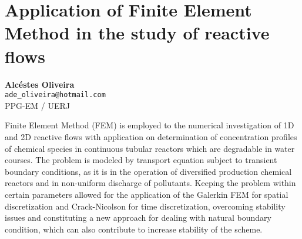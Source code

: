 
\section{Application of Finite Element Method in the study of reactive flows}

\textbf{Alcéstes Oliveira}\\
\texttt{\small{ade\_oliveira@hotmail.com}}\\
PPG-EM / UERJ

Finite Element Method (FEM) is employed to the numerical investigation of 1D and 2D reactive flows with application on determination of concentration profiles of chemical species in continuous tubular reactors which are degradable in water courses. The problem is modeled by transport equation subject to transient boundary conditions, as it is in the operation of diversified production chemical reactors and in non-uniform discharge of pollutants. Keeping the problem within certain parameters allowed for the application of the Galerkin FEM for spatial discretization and Crack-Nicolson for time discretization, overcoming stability issues and constituting a new approach for dealing with natural boundary condition, which can also contribute to increase stability of the scheme.

